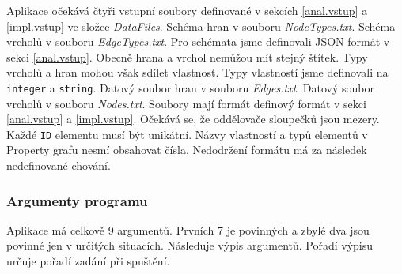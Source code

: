 Aplikace očekává čtyři vstupní soubory definované v sekcích \ref{anal.vstup} a \ref{impl.vstup} ve složce \textit{DataFiles}.
Schéma hran v souboru \textit{NodeTypes.txt}.
Schéma vrcholů v souboru \textit{EdgeTypes.txt}.
Pro schémata jsme definovali JSON formát v sekci \ref{anal.vstup}.
Obecně hrana a vrchol nemůžou mít stejný štítek.
Typy vrcholů a hran mohou však sdílet vlastnost.
Typy vlastností jsme definovali na \texttt{integer} a \texttt{string}. 
Datový soubor hran v souboru \textit{Edges.txt}.
Datový soubor vrcholů v souboru \textit{Nodes.txt}.
Soubory mají formát definový formát v sekci \ref{anal.vstup} a \ref{impl.vstup}.
Očekává se, že oddělovače sloupečků jsou mezery.
Každé \texttt{ID} elementu musí být unikátní.
Názvy vlastností a typů elementů v Property grafu nesmí obsahovat čísla.
Nedodržení formátu má za následek nedefinované chování.

\subsubsection{Argumenty programu} \label{impl.arguments}

Aplikace má celkově 9 argumentů.
Prvních 7 je povinných a zbylé dva jsou povinné jen v určitých situacích.
Následuje výpis argumentů.
Pořadí výpisu určuje pořadí zadání při spuštění.


